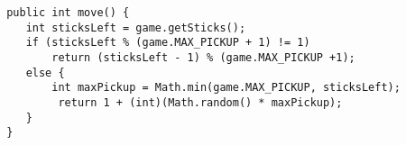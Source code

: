 \begin{ANS}
\begin{jjjlisting}
\begin{lstlisting}
 public int move() {   
    int sticksLeft = game.getSticks();
    if (sticksLeft % (game.MAX_PICKUP + 1) != 1)
        return (sticksLeft - 1) % (game.MAX_PICKUP +1);
    else {
        int maxPickup = Math.min(game.MAX_PICKUP, sticksLeft);
         return 1 + (int)(Math.random() * maxPickup);
    }
 }
\end{lstlisting}
\end{jjjlisting}

\end{ANS}

\label{exercises}
